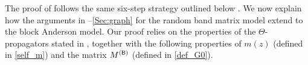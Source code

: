 
The proof of  follows the same six-step strategy outlined below . We now explain how the arguments in --\ref{Sec:graph} for the random band matrix model extend to the block Anderson model. Our proof relies on the properties of the $\Theta$-propagators stated in , together with the following properties of $m(z)$ (defined in \eqref{self_m}) and the matrix $M^{({\mathsf{B}})}$ (defined in \eqref{def_G0}).



